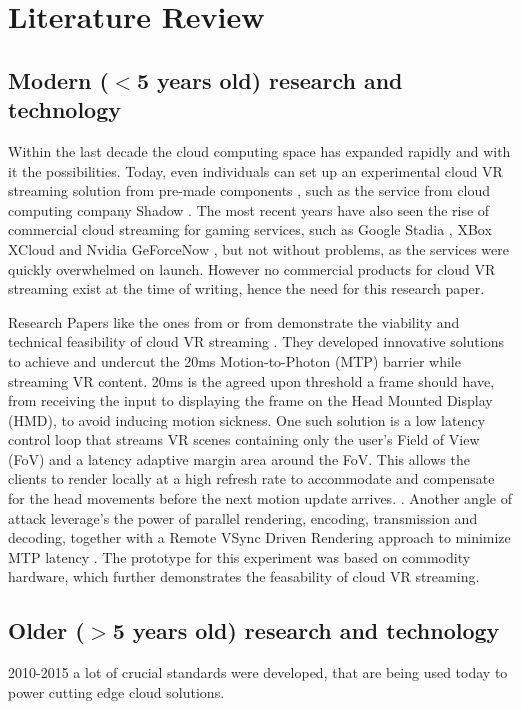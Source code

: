 \section{Literature Review}
\subsection{Modern ($<$5 years old) research and technology}

Within the last decade the cloud computing space has expanded rapidly and with it the possibilities. Today, even individuals can set up an experimental cloud VR streaming solution from pre-made components \parencite{tayoexe}, such as the service from cloud computing company Shadow \parencite{shadow}. The most recent years have also seen the rise of commercial cloud streaming for gaming services, such as Google Stadia \parencite{stadia}, XBox XCloud \parencite{xcloud} and Nvidia GeForceNow \parencite{geforcenow}, but not without problems, as the services were quickly overwhelmed on launch. However no commercial products for cloud VR streaming exist at the time of writing, hence the need for this research paper.

Research Papers like the ones from \cite{cutcord} or from \cite{mvr} demonstrate the viability and technical feasibility of cloud VR streaming . They developed innovative solutions to achieve and undercut the 20ms Motion-to-Photon (MTP) barrier while streaming VR content. 20ms is the agreed upon threshold a frame should have, from receiving the input to displaying the frame on the Head Mounted Display (HMD), to avoid inducing motion sickness. One such solution is a low latency control loop that streams VR scenes containing only the user’s Field of View (FoV) and a latency adaptive margin area around the FoV. This allows the clients to render locally at a high refresh rate to accommodate and compensate for the head movements before the next motion update arrives. \parencite{mvr}. Another angle of attack  leverage's the power of parallel rendering, encoding, transmission and decoding, together with a Remote VSync Driven Rendering approach to minimize MTP latency \parencite{cutcord}. The prototype for this experiment was based on commodity hardware, which further demonstrates the feasability of cloud VR streaming.

\subsection{Older ($>$5 years old) research and technology} 

2010-2015 a lot of crucial standards were developed, that are being used today to power cutting edge cloud solutions.